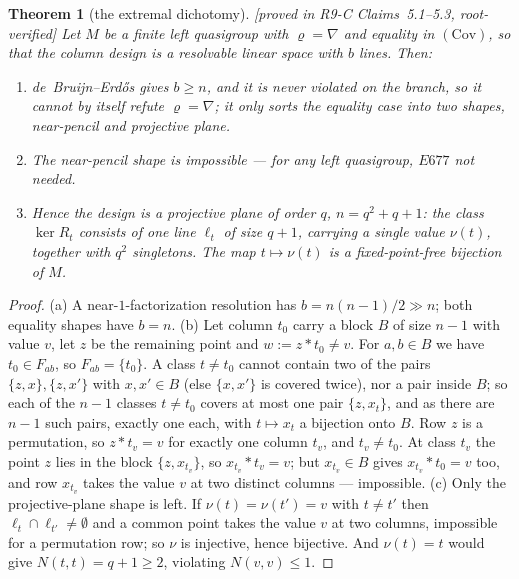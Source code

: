 \documentclass[11pt]{article}
\theoremstyle{plain}
\newtheorem{theorem}{Theorem}[section]
\theoremstyle{definition}
\theoremstyle{remark}
\numberwithin{equation}{section}
\newcommand{\op}{\mathbin{*}}
\newcommand{\statusbox}[1]{{\small\sloppy\textsf{[#1]}}}
\newcommand{\PROVED}[1]{\statusbox{proved in #1, root-verified}}
\begin{document}
\begin{theorem}[the extremal dichotomy]\label{thm:extremal}
\PROVED{R9-C Claims~5.1--5.3}
Let $M$ be a finite left quasigroup with $\varrho = \nabla$ and equality in
$(\mathrm{Cov})$, so that the column design is a resolvable linear space with $b$
lines. Then:
\begin{enumerate}
\item[(a)] de~Bruijn--Erd\H{o}s gives $b\ge n$, and it is never violated on the
branch, so it cannot by itself refute $\varrho = \nabla$; it only sorts the
equality case into two shapes, near-pencil and projective plane.
\item[(b)] \emph{The near-pencil shape is impossible} --- for any left
quasigroup, $E677$ not needed.
\item[(c)] Hence the design is a projective plane of order $q$, $n = q^2+q+1$: the
class $\ker R_t$ consists of one line $\ell_t$ of size $q+1$, carrying a single
value $\nu(t)$, together with $q^2$ singletons. The map $t\mapsto\nu(t)$ is a
fixed-point-free bijection of $M$.
\end{enumerate}
\end{theorem}

\begin{proof}
(a) A near-$1$-factorization resolution has $b = n(n-1)/2\gg n$; both equality
shapes have $b = n$.
(b) Let column $t_0$ carry a block $B$ of size $n-1$ with value $v$, let $z$ be
the remaining point and $w := z\op t_0\ne v$. For $a,b\in B$ we have $t_0\in F_{ab}$,
so $F_{ab} = \{t_0\}$. A class $t\ne t_0$ cannot contain two of the pairs
$\{z,x\},\{z,x'\}$ with $x,x'\in B$ (else $\{x,x'\}$ is covered twice), nor a pair
inside $B$; so each of the $n-1$ classes $t\ne t_0$ covers at most one pair
$\{z,x_t\}$, and as there are $n-1$ such pairs, exactly one each, with
$t\mapsto x_t$ a bijection onto $B$. Row $z$ is a permutation, so $z\op t_v = v$
for exactly one column $t_v$, and $t_v\ne t_0$. At class $t_v$ the point $z$ lies
in the block $\{z,x_{t_v}\}$, so $x_{t_v}\op t_v = v$; but $x_{t_v}\in B$ gives
$x_{t_v}\op t_0 = v$ too, and row $x_{t_v}$ takes the value $v$ at two distinct
columns --- impossible.
(c) Only the projective-plane shape is left. If $\nu(t) = \nu(t') = v$ with
$t\ne t'$ then $\ell_t\cap\ell_{t'}\ne\emptyset$ and a common point takes the value
$v$ at two columns, impossible for a permutation row; so $\nu$ is injective, hence
bijective. And $\nu(t) = t$ would give $N(t,t) = q+1\ge2$, violating
$N(v,v)\le1$.
\end{proof}
\end{document}

